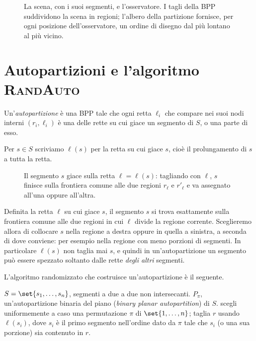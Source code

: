 \begin{figure}[H]
\centering

\caption{La scena, con i suoi segmenti, e l'osservatore. I tagli della BPP suddividono la
scena in regioni; l'albero della partizione fornisce, per ogni posizione dell'osservatore,
un ordine di disegno dal più lontano al più vicino.}
\end{figure}

\section{Autopartizioni e l'algoritmo \textsc{RandAuto}}

\begin{definizione}[autopartizione]\label{def:autopartizione}
Un'\emph{autopartizione} è una BPP tale che ogni retta $\ell_i$ che compare nei suoi nodi
interni $(r_i,\ell_i)$ è una delle rette su cui giace un segmento di $S$, o una parte di esso.
\end{definizione}

Per $s\in S$ scriviamo $\ell(s)$ per la retta su cui giace $s$, cioè il prolungamento di $s$
a tutta la retta.

\begin{figure}[H]
\centering

\caption{Il segmento $s$ giace sulla retta $\ell=\ell(s)$: tagliando con $\ell$, $s$ finisce
sulla frontiera comune alle due regioni $r_\ell$ e $r'_\ell$ e va assegnato all'una oppure
all'altra.}
\end{figure}

\begin{osservazione}\label{oss:frontiera}
Definita la retta $\ell$ su cui giace $s$, il segmento $s$ si trova esattamente sulla
frontiera comune alle due regioni in cui $\ell$ divide la regione corrente. Sceglieremo
allora di collocare $s$ nella regione a destra oppure in quella a sinistra, a seconda di
dove conviene: per esempio nella regione con meno porzioni di segmenti. In particolare
$\ell(s)$ non taglia mai $s$, e quindi in un'autopartizione un segmento può essere spezzato
soltanto dalle rette \emph{degli altri} segmenti.
\end{osservazione}

L'algoritmo randomizzato che costruisce un'autopartizione è il seguente.

\begin{algorithm}[H]
\caption{\textsc{RandAuto}}
\begin{algorithmic}[1]
\Require $S=\set{s_1,\dots,s_n}$, segmenti a due a due non intersecanti.
\Ensure $P_\pi$, un'autopartizione binaria del piano (\emph{binary planar autopartition})
di $S$.
\State scegli uniformemente a caso una permutazione $\pi$ di $\set{1,\dots,n}$;
    \State taglia $r$ usando $\ell(s_i)$, dove $s_i$ è il primo segmento nell'ordine dato
    da $\pi$ tale che $s_i$ (o una sua porzione) sia contenuto in $r$.
\EndWhile
\end{algorithmic}
\end{algorithm}


